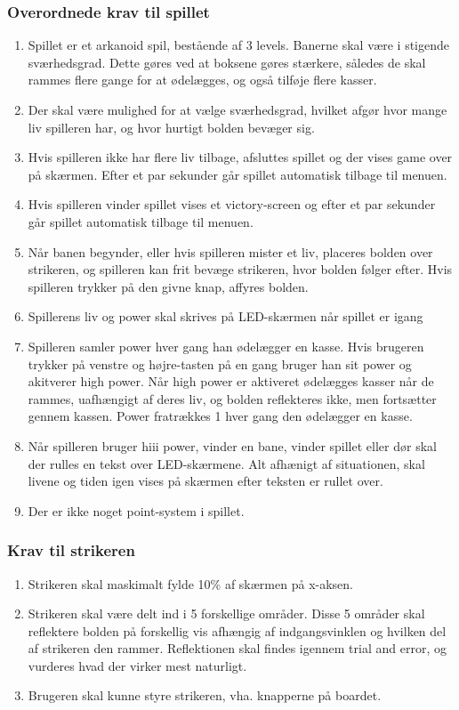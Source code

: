 \subsubsection{Overordnede krav til spillet}
\begin{enumerate}
\item Spillet er et arkanoid spil, bestående af 3 levels. Banerne skal være i stigende sværhedsgrad. Dette gøres ved at boksene gøres stærkere, således de skal rammes flere gange for at ødelægges, og også tilføje flere kasser.
\item Der skal være mulighed for at vælge sværhedsgrad, hvilket afgør hvor mange liv spilleren har, og hvor hurtigt bolden bevæger sig.
\item Hvis spilleren ikke har flere liv tilbage, afsluttes spillet og der vises game over på skærmen. Efter et par sekunder går spillet automatisk tilbage  til menuen.
\item Hvis spilleren vinder spillet vises et victory-screen og efter et par sekunder går spillet automatisk tilbage til menuen.
\item Når banen begynder, eller hvis spilleren mister et liv, placeres bolden over strikeren, og spilleren kan frit bevæge strikeren, hvor bolden følger efter. Hvis spilleren trykker på den givne knap, affyres bolden.
\item Spillerens liv og power skal skrives på LED-skærmen når spillet er igang
\item Spilleren samler power hver gang han ødelægger en kasse. Hvis brugeren trykker på venstre og højre-tasten på en gang bruger han sit power og akitverer high power. Når high power er aktiveret ødelægges kasser når de rammes, uafhængigt af deres liv, og bolden reflekteres ikke, men fortsætter gennem kassen. Power fratrækkes 1 hver gang den ødelægger en kasse.
\item Når spilleren bruger hiii power, vinder en bane, vinder spillet eller dør skal der rulles en tekst over LED-skærmene. Alt afhænigt af situationen, skal livene og tiden igen vises på skærmen efter teksten er rullet over.
\item Der er ikke noget point-system i spillet.
\end{enumerate}
\subsubsection{Krav til strikeren}
\begin{enumerate}
\item Strikeren skal maskimalt fylde 10\% af skærmen på x-aksen. 
\item  Strikeren skal være delt ind i 5 forskellige områder. Disse 5 områder skal reflektere bolden på forskellig vis afhængig af indgangsvinklen og hvilken del af strikeren den rammer. Reflektionen skal findes igennem trial and error, og vurderes hvad der virker mest naturligt.
\item Brugeren skal kunne styre strikeren, vha. knapperne på boardet.
\end{enumerate}
